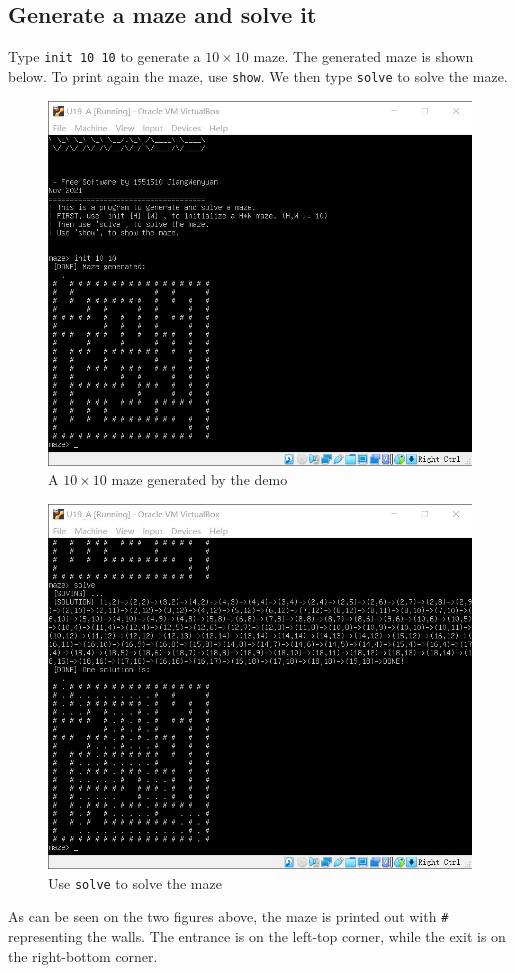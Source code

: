 \documentclass[cn,black,12pt,normal]{elegantnote}
\begin{document}
\subsection{Generate a maze and solve it}

Type \lstinline{init 10 10} to generate a $10 \times 10$ maze. The generated maze is shown below. To print again the maze, use \lstinline{show}. We then type \lstinline{solve} to solve the maze.

\begin{figure}[H]
    \centering
    \includegraphics[width=0.7\linewidth]{image/m02.jpg}
    \caption{A $10 \times 10$ maze generated by the demo}
\end{figure}

\begin{figure}[H]
    \centering
    \includegraphics[width=0.7\linewidth]{image/m03.jpg}
    \caption{Use \lstinline{solve} to solve the maze}
\end{figure}

As can be seen on the two figures above, the maze is printed out with \lstinline{#} representing the walls. The entrance is on the left-top corner, while the exit is on the right-bottom corner.
\end{document}
